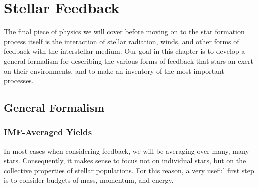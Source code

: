 \chapter{Stellar Feedback}
\label{ch:feedback}


The final piece of physics we will cover before moving on to the star formation process itself is the interaction of stellar radiation, winds, and other forms of feedback with the interstellar medium. Our goal in this chapter is to develop a general formalism for describing the various forms of feedback that stars an exert on their environments, and to make an inventory of the most important processes.

\section{General Formalism}

\subsection{IMF-Averaged Yields}

In most cases when considering feedback, we will be averaging over many, many stars. Consequently, it makes sense to focus not on individual stars, but on the collective properties of stellar populations. For this reason, a very useful first step is to consider budgets of mass, momentum, and energy.

